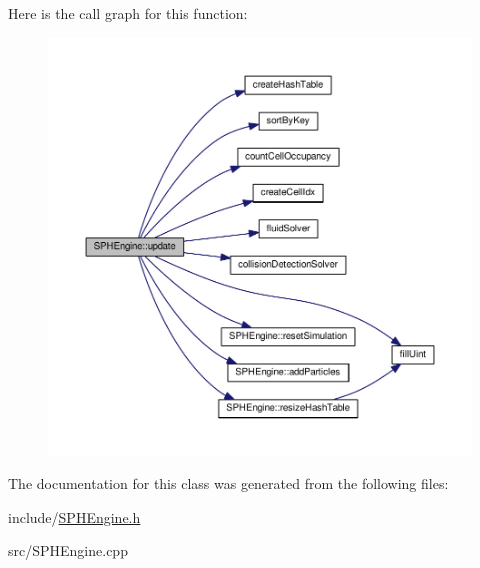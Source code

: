 Here is the call graph for this function\-:\nopagebreak
\begin{figure}[H]
\begin{center}
\leavevmode
\includegraphics[width=350pt]{class_s_p_h_engine_a1a17b5c04756850b68cf95b917019241_cgraph}
\end{center}
\end{figure}




The documentation for this class was generated from the following files\-:\begin{DoxyCompactItemize}
\item 
include/\hyperlink{_s_p_h_engine_8h}{S\-P\-H\-Engine.\-h}\item 
src/S\-P\-H\-Engine.\-cpp\end{DoxyCompactItemize}
